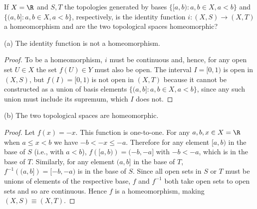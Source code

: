 \setcounter{question}{20} %
\begin{question}[Ewing]
If $X=\R$ and $S,T$ the topologies generated by bases $\{[a,b)\colon a,b\in X, a<b\}$ and $\{(a,b]\colon a,b\in X, a<b\}$, respectively, is the identity function $i\colon (X,S)\to(X,T)$ a homeomorphism and are the two topological spaces homeomorphic?
\end{question}

(a) The identity function is not a homeomorphism.

\begin{proof}
To be a homeomorphism, $i$ must be continuous and, hence, for any open set $U\in X$ the set $f(U)\in Y$ must also be open. The interval $I=[0,1)$ is open in $(X,S)$, but $f(I)=[0,1)$ is not open in $(X,T)$ because it cannot be constructed as a union of basis elements $\{(a,b]\colon a,b\in X, a<b\}$, since any such union must include its supremum, which $I$ does not.
\end{proof}

(b) The two topological spaces are homeomorphic.

\begin{proof}
Let $f(x)=-x$. This function is one-to-one. For any $a,b,x\in X=\R$ when $a\le x<b$ we have $-b<-x\le -a$. Therefore for any element $[a,b)$ in the base of $S$ (i.e., with $a<b$), $f\left([a,b)\right)=(-b,-a]$ with $-b<-a$, which is in the base of $T$. Similarly, for any element $(a,b]$ in the base of $T$, $f^{-1}\left((a,b]\right)=[-b,-a)$ is in the base of $S$. Since all open sets in $S$ or $T$ must be unions of elements of the respective base, $f$ and $f^{-1}$ both take open sets to open sets and so are continuous. Hence $f$ is a homeomorphism, making $(X,S)\equiv(X,T)$.
\end{proof}
